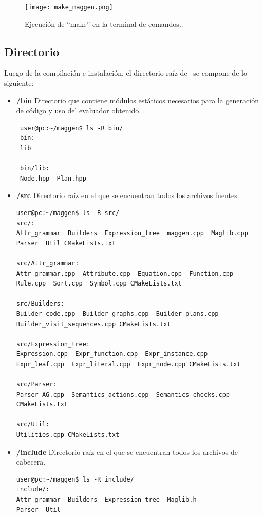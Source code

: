 \begin{figure}[!ht]\centering
\texttt{[image: make\_maggen.png]}
\caption{\label{fig:make_maggen} Ejecución de ``make'' en la terminal de comandos..}
\end{figure}
 
\subsection{Directorio }
Luego de la compilación e instalación, el directorio raíz de \maggen\ se compone de lo siguiente:
\begin{itemize}
\item \textbf{/bin} Directorio que contiene módulos estáticos necesarios para la generación de código y uso del evaluador obtenido.
{\footnotesize \begin{verbatim}
 user@pc:~/maggen$ ls -R bin/
 bin:
 lib

 bin/lib:
 Node.hpp  Plan.hpp
\end{verbatim} }
 
\item \textbf{/src} Directorio raíz en el que se encuentran todos los archivos fuentes.
{\footnotesize \begin{verbatim}
user@pc:~/maggen$ ls -R src/ 
src/:
Attr_grammar  Builders  Expression_tree  maggen.cpp  Maglib.cpp  
Parser  Util CMakeLists.txt

src/Attr_grammar:
Attr_grammar.cpp  Attribute.cpp  Equation.cpp  Function.cpp  
Rule.cpp  Sort.cpp  Symbol.cpp CMakeLists.txt

src/Builders:
Builder_code.cpp  Builder_graphs.cpp  Builder_plans.cpp  
Builder_visit_sequences.cpp CMakeLists.txt

src/Expression_tree:
Expression.cpp  Expr_function.cpp  Expr_instance.cpp  
Expr_leaf.cpp  Expr_literal.cpp  Expr_node.cpp CMakeLists.txt

src/Parser:
Parser_AG.cpp  Semantics_actions.cpp  Semantics_checks.cpp
CMakeLists.txt

src/Util:
Utilities.cpp CMakeLists.txt
\end{verbatim} }

\item \textbf{/include} Directorio raíz en el que se encuentran todos los archivos de cabecera.

{\footnotesize \begin{verbatim}
user@pc:~/maggen$ ls -R include/
include/:
Attr_grammar  Builders  Expression_tree  Maglib.h  
Parser  Util


\end{verbatim}}
\end{itemize}
